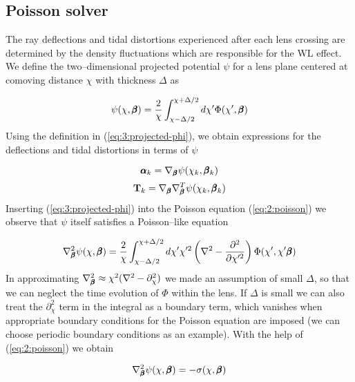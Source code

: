 \subsection{Poisson solver}
The ray deflections and tidal distortions experienced after each lens crossing are determined by the density fluctuations which are responsible for the WL effect. We define the two--dimensional projected potential $\psi$ for a lens plane centered at comoving distance $\chi$ with thickness $\Delta$ as

\begin{equation}
\label{eq:3:projected-phi}
\psi(\chi,\pmb{\beta}) = \frac{2}{\chi}\int_{\chi-\Delta/2}^{\chi+\Delta/2}d\chi' \Phi(\chi',\pmb{\beta})
\end{equation} 
%
Using the definition in (\ref{eq:3:projected-phi}), we obtain expressions for the deflections and tidal distortions in terms of $\psi$

\begin{equation}
\label{eq:3:alphak-psi}
\pmb{\alpha}_k = \nabla_{\pmb{\beta}}\psi(\chi_k,\pmb{\beta}_k)
\end{equation}
%
\begin{equation}
\label{eq:3:Tk-psi}
\mathbf{T}_k = \nabla_{\pmb{\beta}}\nabla^T_{\pmb{\beta}}\psi(\chi_k,\pmb{\beta}_k)
\end{equation}
%
Inserting (\ref{eq:3:projected-phi}) into the Poisson equation (\ref{eq:2:poisson}) we observe that $\psi$ itself satisfies a Poisson--like equation

\begin{equation}
\label{eq:3:poisson-psi-1}
\nabla^2_{\pmb{\beta}}\psi(\chi,\pmb{\beta}) = \frac{2}{\chi}\int_{\chi-\Delta/2}^{\chi+\Delta/2}d\chi' \chi'^2\left(\nabla^2-\frac{\partial^2}{\partial \chi'^2}\right)\Phi(\chi',\chi'\pmb{\beta})
\end{equation}
%
In approximating $\nabla^2_{\pmb{\beta}}\approx \chi^2(\nabla^2-\partial_\chi^2)$ we made an assumption of small $\Delta$, so that we can neglect the time evolution of $\Phi$ within the lens. If $\Delta$ is small we can also treat the $\partial^2_\chi$ term in the integral as a boundary term, which vanishes when appropriate boundary conditions for the Poisson equation are imposed (we can choose periodic boundary conditions as an example). With the help of (\ref{eq:2:poisson}) we obtain

\begin{equation}
\label{eq:3:poisson-psi-2}
\nabla^2_{\pmb{\beta}}\psi(\chi,\pmb{\beta}) = -\sigma(\chi,\pmb{\beta})  
\end{equation} 

